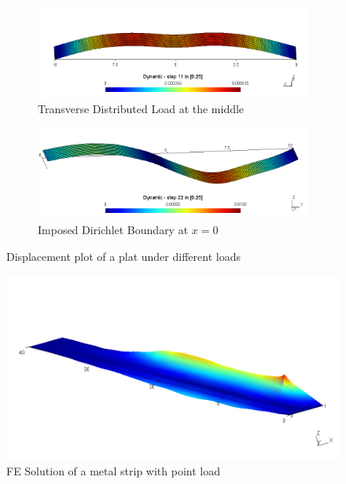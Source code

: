 \documentclass[main.tex]{subfiles}
\begin{document}
\begin{figure}[h!]\label{fig:res:FEMvsGAL}
\begin{subfigure}{.98\textwidth}
\includegraphics[width=\linewidth,trim={0cm 0 0cm 0},clip]{images/FvsD_F.png}
\caption{Transverse Distributed Load at the middle}
\end{subfigure} \vfill
\begin{subfigure}{.98\textwidth}
\includegraphics[width=\linewidth,trim={0cm 0 0cm 0},clip]{images/FvsD_D.png}
\caption{Imposed Dirichlet Boundary at $x=0$}
\end{subfigure}

\caption{Displacement plot of a plat under different loads}
\end{figure}





\begin{figure}[h!]

\includegraphics[width=\linewidth,trim={1cm 0 1cm 0},clip]{images/FEMvsGAL.png}



\caption{FE Solution of a metal strip with point load}
\end{figure}
\end{document}
